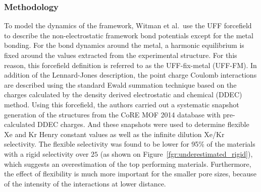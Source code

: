 \documentclass[main]{subfiles}
\begin{document}
\subsubsection{Methodology}

To model the dynamics of the framework, Witman et al.\ use the UFF forcefield to describe the non-electrostatic framework bond potentials except for the metal bonding. For the bond dynamics around the metal, a harmonic equilibrium is fixed around the values extracted from the experimental structure. For this reason, this forcefield definition is referred to as the UFF-fix-metal (UFF-FM). In addition of the Lennard-Jones description, the point charge Coulomb interactions are described using the standard Ewald summation technique based on the charges calculated by the density derived electrostatic and chemical (DDEC) method.\autocite{manz2010chemically} Using this forcefield, the authors carried out a systematic snapshot generation of the structures from the CoRE MOF 2014 database with pre-calculated DDEC charges. And these snapshots were used to determine flexible Xe and Kr Henry constant values as well as the infinite dilution Xe/Kr selectivity. The flexible selectivity was found to be lower for {95\%} of the materials with a rigid selectivity over $25$ (as shown on Figure~\ref{fgr:underestimated_rigid}), which suggests an overestimation of the top performing materials. Furthermore, the effect of flexibility is much more important for the smaller pore sizes, because of the intensity of the interactions at lower distance. 
\end{document}
